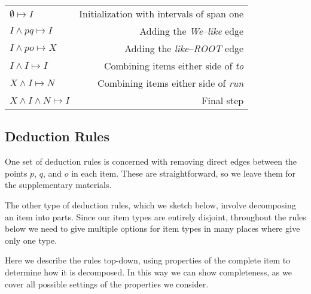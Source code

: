 \begin{center}
\begin{tabular}{lr}
  $\emptyset \mapsto I$ & Initialization with intervals of span one \\
  $I \land pq \mapsto I$ & Adding the \emph{We}--\emph{like} edge\\
  $I \land po \mapsto X$ & Adding the \emph{like}--\emph{ROOT} edge \\
  $I \land I \mapsto I$ & Combining items either side of \emph{to} \\
  $X \land I \mapsto N$ & Combining items either side of \emph{run} \\
  $X \land I \land N \mapsto I$ & Final step \\
\end{tabular}
\end{center}

\subsection{Deduction Rules}
One set of deduction rules is concerned with removing direct edges between the points $p$, $q$, and $o$ in each item.
These are straightforward, so we leave them for the supplementary materials.

The other type of deduction rules, which we sketch below, involve decomposing an item into parts.
Since our item types are entirely disjoint, throughout the rules below we need to give multiple options for item types in many places where \textcite{ec} give only one type.

Here we describe the rules top-down, using properties of the complete item to determine how it is decomposed.
In this way we can show completeness, as we cover all possible settings of the properties we consider.

